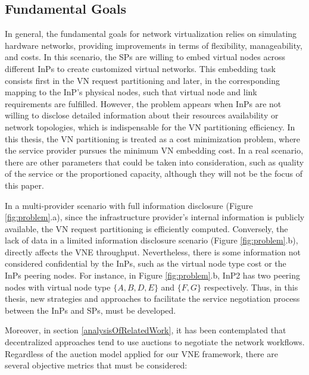\subsection{Fundamental Goals}

In general, the fundamental goals for network virtualization relies on simulating hardware networks, providing improvements in terms of flexibility, manageability, and costs. In this scenario, the SPs are willing to embed virtual nodes across different InPs to create customized virtual networks. This embedding task consists first in the VN request partitioning and later, in the corresponding mapping to the InP's physical nodes, such that virtual node and link requirements are fulfilled. However, the problem appears when InPs are not willing to disclose detailed information about their resources availability or network topologies, which is indispensable for the VN partitioning efficiency. In this thesis, the VN partitioning is treated as a cost minimization problem, where the service provider pursues the minimum VN embedding cost. In a real scenario, there are other parameters that could be taken into consideration, such as quality of the service or the proportioned capacity, although they will not be the focus of this paper.

In a multi-provider scenario with full information disclosure (Figure \ref{fig:problem}.a), since the infrastructure provider's internal information is publicly available, the VN request partitioning is efficiently computed. Conversely, the lack of data in a limited information disclosure scenario (Figure \ref{fig:problem}.b), directly affects the VNE throughput. Nevertheless, there is some information not considered confidential by the InPs, such as the virtual node type cost or the InPs peering nodes. For instance, in Figure \ref{fig:problem}.b, InP2 has two peering nodes with virtual node type $\{A,B,D,E\}$ and $\{F,G\}$ respectively. Thus, in this thesis, new strategies and approaches to facilitate the service negotiation process between the InPs and SPs, must be developed. 

Moreover, in section \ref{analysisOfRelatedWork}, it has been contemplated that decentralized approaches tend to use auctions to negotiate the network workflows. Regardless of the auction model applied for our VNE framework, there are several objective metrics that must be considered: 

